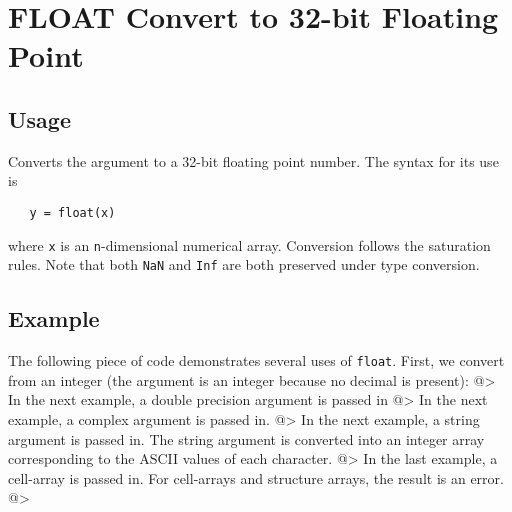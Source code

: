 \section{FLOAT Convert to 32-bit Floating Point}

\subsection{Usage}

Converts the argument to a 32-bit floating point number.  The syntax
for its use is
\begin{verbatim}
   y = float(x)
\end{verbatim}
where \verb|x| is an \verb|n|-dimensional numerical array.  
Conversion follows the saturation rules.  Note that both 
\verb|NaN| and \verb|Inf| are both preserved under type conversion.
\subsection{Example}

The following piece of code demonstrates several uses of \verb|float|. 
First, we convert from an integer (the argument is an integer 
because no decimal is present):
@>
In the next example, a double precision argument is passed 
in
@>
In the next example, a complex argument is passed in.
@>
In the next example, a string argument is passed in.  The string 
argument is converted into an integer array corresponding to the 
ASCII values of each character.
@>
In the last example, a cell-array is passed in.  For cell-arrays 
and structure arrays, the result is an error.
@>
